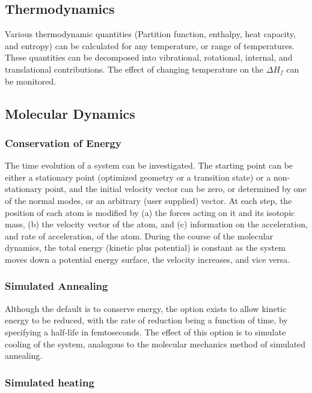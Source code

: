 \subsection{Thermodynamics}

Various thermodynamic quantities (Partition function, enthalpy, heat capacity,
and entropy) can be calculated for any temperature, or range of temperatures.
These quantities can be decomposed into vibrational, rotational, internal, and
translational contributions.  The effect of changing temperature on the
$\Delta H_f$ can be monitored.

\subsection{Molecular Dynamics}

\subsubsection*{Conservation of Energy}

The time evolution of a system can be investigated.  The starting point can be
either a stationary point (optimized geometry or a transition state) or a
non-stationary point, and the initial velocity vector can  be zero, or
determined by one  of the normal modes, or an arbitrary (user supplied)
vector.  At each step, the  position of each atom is modified by (a) the forces
acting on it and its isotopic  mass, (b) the velocity vector of the atom, and
(c) information on the  acceleration, and rate of acceleration, of the atom.
During the course of the  molecular dynamics, the total energy (kinetic plus
potential) is constant  as the  system moves down a potential energy surface,
the velocity increases, and vice  versa.

\subsubsection*{Simulated Annealing}

Although the default is to conserve energy, the option exists to allow kinetic
energy to be reduced, with the rate of reduction being a function of time, by
specifying a half-life in femtoseconds.  The effect of this option is to
simulate  cooling of the system, analogous to the molecular mechanics method
of  simulated annealing.

\subsubsection*{Simulated heating}

